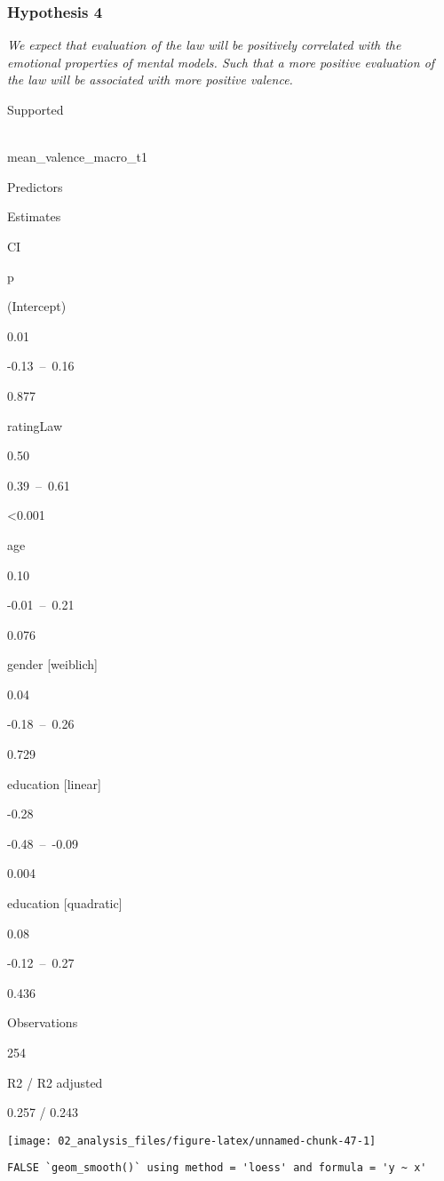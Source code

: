 \documentclass[
]{article}
\begin{document}
\hypertarget{hypothesis-4}{%
\subsubsection{Hypothesis 4}\label{hypothesis-4}}

\emph{We expect that evaluation of the law will be positively correlated
with the emotional properties of mental models. Such that a more
positive evaluation of the law will be associated with more positive
valence.}

Supported\\

~

mean\_valence\_macro\_t1

Predictors

Estimates

CI

p

(Intercept)

0.01

-0.13~--~0.16

0.877

ratingLaw

0.50

0.39~--~0.61

\textless0.001

age

0.10

-0.01~--~0.21

0.076

gender {[}weiblich{]}

0.04

-0.18~--~0.26

0.729

education {[}linear{]}

-0.28

-0.48~--~-0.09

0.004

education {[}quadratic{]}

0.08

-0.12~--~0.27

0.436

Observations

254

R2 / R2 adjusted

0.257 / 0.243

\begin{center}\texttt{[image: 02\_analysis\_files/figure-latex/unnamed-chunk-47-1]} \end{center}

\begin{verbatim}
FALSE `geom_smooth()` using method = 'loess' and formula = 'y ~ x'
\end{verbatim}
\end{document}
